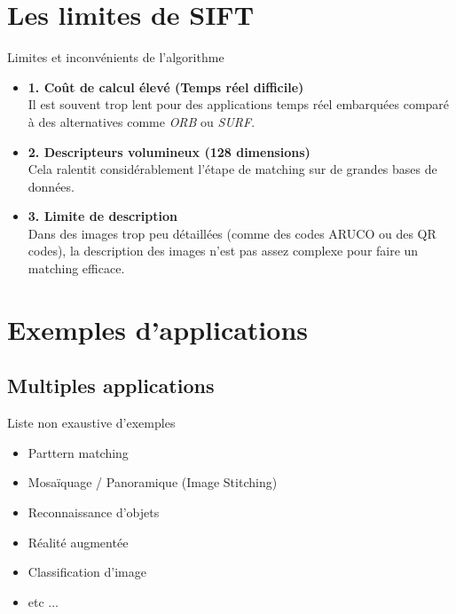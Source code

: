 \documentclass{beamer}
\begin{document}
\section{Les limites de SIFT}
\begin{frame}{Limites et inconvénients de l'algorithme}

    \begin{itemize}
        \item \textbf{1. Coût de calcul élevé (Temps réel difficile)}
		\\        
        Il est souvent trop lent pour des applications temps réel embarquées comparé à des alternatives comme \textit{ORB} ou \textit{SURF}.
        
        \vspace{0.3cm} %
        
        \item \textbf{2. Descripteurs volumineux (128 dimensions)}
		\\        
        Cela ralentit considérablement l'étape de matching sur de grandes bases de données.
        
        \vspace{0.3cm}
        
        \item \textbf{3. Limite de description}
		\\        
        Dans des images trop peu détaillées (comme des codes ARUCO ou des QR codes), la description des images n'est pas assez complexe pour faire un matching efficace.

    \end{itemize}
\end{frame}

\section{Exemples d'applications}
\subsection{Multiples applications}
\begin{frame}{Liste non exaustive d'exemples}
    \begin{itemize}
        \item Parttern matching  
        \item Mosaïquage / Panoramique (Image Stitching)
        \item Reconnaissance d’objets
        \item Réalité augmentée
        \item Classification d'image
        \item etc ...
    \end{itemize}
\end{frame}
\end{document}
